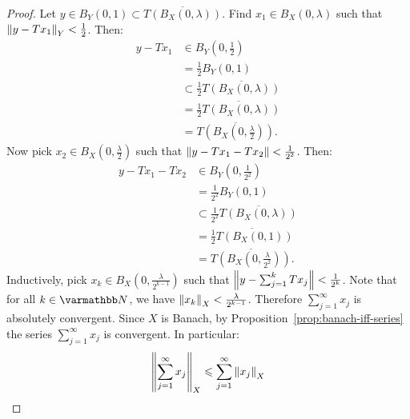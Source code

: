 \begin{proof}
            Let $y \in B_Y(0,1) \subset \overline{T(B_X(0,\lambda))}$. Find $x_1 \in B_X(0,\lambda)$ such that $\left\lVert y - T x_1 \right\rVert_Y < \frac{1}{2}$. Then:
                \begin{equation*}
                \begin{split}
                    y -  Tx_1 
                    & \in B_Y\left(0,\frac{1}{2}\right) \\
                    & = \frac{1}{2}B_Y(0,1) \\
                    & \subset \frac{1}{2}\overline{T(B_X(0,\lambda))} \\
                    & = \overline{\frac{1}{2}T(B_X(0,\lambda))} \\
                    & = \overline{T \left( B_X \left( 0,\frac{\lambda}{2} \right) \right)}.
                \end{split}
                \end{equation*}
            Now pick $x_2 \in B_X(0,\frac{\lambda}{2})$ such that $\left\lVert y - Tx_1 - T x_2 \right\rVert < \frac{1}{2^2}$. Then:
                \begin{equation*}
                \begin{split}
                    y - Tx_1 - T x_2 
                    & \in B_Y(0,\frac{1}{2^2}) \\
                    & = \frac{1}{2^2} B_Y(0,1) \\
                    & \subset \frac{1}{2^2} \overline{T(B_X(0,\lambda))} \\
                    & = \overline{\frac{1}{2} T(B_X(0,1))} \\
                    & = \overline{T \left( B_X \left( 0,\frac{\lambda}{2^2} \right) \right)}.
                \end{split}
                \end{equation*}
            Inductively, pick $x_k \in B_X(0, \frac{\lambda}{2^{k-1}})$ such that $\left\lVert y - \sum_{j = 1}^k T x_j \right\rVert < \frac{1}{2^k}$. Note that for all $k \in \bfN$, we have $\left\lVert x_k \right\rVert_X < \frac{\lambda}{2^{k-1}}$. Therefore $\sum_{j = 1}^\infty x_j$ is absolutely convergent. Since $X$ is Banach, by Proposition~\ref{prop:banach-iff-series} the series $\sum_{j = 1}^\infty x_j$ is convergent. In particular:
                \begin{equation*}
                \begin{split}
                    \lnorm \sum_{j = 1}^\infty x_j \rnorm_X
                    & \leq \sum_{j = 1}^\infty \lnorm x_j \rnorm_X \\

\end{split}
\end{equation*}
\end{proof}
